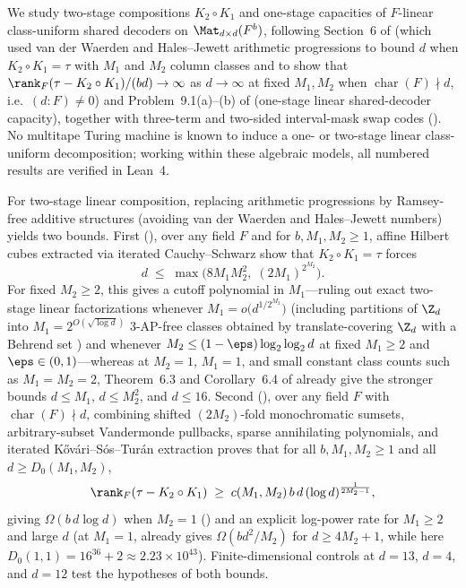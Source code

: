 We study two-stage compositions $K_2 \circ K_1$ and one-stage capacities of $F$-linear class-uniform
shared decoders on $\Mat_{d\times d}(F^b)$, following Section~6 of \cite{SharedDecoders2026} (which
used van der Waerden and Hales--Jewett arithmetic progressions to bound $d$ when $K_2 \circ K_1 = \tau$
with $M_1$ and $M_2$ column classes and to show that
$\rank_F(\tau - K_2 \circ K_1)/(bd) \to \infty$ as $d \to \infty$ at fixed $M_1, M_2$ when
$\operatorname{char}(F) \nmid d$, i.e.\ $(d : F) \ne 0$) and Problem~9.1(a)--(b) of
\cite{SeventeenthPaper2026} (one-stage linear shared-decoder capacity), together with three-term and
two-sided interval-mask swap codes (\cite[Remark~5.6 and Problem~9.3]{SeventeenthPaper2026}). No
multitape Turing machine is known to induce a one- or two-stage linear class-uniform decomposition;
working within these algebraic models, all numbered results are verified in Lean~4.

For two-stage linear composition, replacing arithmetic progressions by Ramsey-free additive structures
(avoiding van der Waerden and Hales--Jewett numbers) yields two bounds. First (), over any
field $F$ and for $b, M_1, M_2 \ge 1$, affine Hilbert cubes extracted via iterated Cauchy--Schwarz show
that $K_2 \circ K_1 = \tau$ forces
\[
  d \;\le\; \max\bigl(8 M_1 M_2^2,\; (2 M_1)^{2^{M_2}}\bigr).
\]
For fixed $M_2 \ge 2$, this gives a cutoff polynomial in $M_1$---ruling out exact two-stage linear
factorizations whenever $M_1 = o\bigl(d^{1/2^{M_2}}\bigr)$ (including partitions of $\Z_d$ into
$M_1 = 2^{O(\sqrt{\log d})}$ $3$-AP-free classes obtained by translate-covering $\Z_d$ with a Behrend
set \cite{Behrend1946}) and whenever $M_2 \le (1-\eps)\log_2\log_2 d$ at fixed $M_1 \ge 2$ and
$\eps \in (0, 1)$---whereas at $M_2 = 1$, $M_1 = 1$, and small constant class counts such as
$M_1 = M_2 = 2$, Theorem~6.3 and Corollary~6.4 of \cite{SharedDecoders2026} already give the stronger
bounds $d \le M_1$, $d \le M_2^2$, and $d \le 16$. Second (), over any field
$F$ with $\operatorname{char}(F) \nmid d$, combining shifted $(2M_2)$-fold monochromatic sumsets,
arbitrary-subset
Vandermonde pullbacks, sparse annihilating polynomials, and iterated K\H{o}v\'ari--S\'os--Tur\'an
extraction proves that for all $b, M_1, M_2 \ge 1$ and all $d \ge D_0(M_1, M_2)$,
\[
  \rank_F(\tau - K_2 \circ K_1)
  \;\ge\;
  c(M_1, M_2)\,b\,d\,(\log d)^{\frac{1}{2M_2 - 1}},
\]
giving $\Omega(b\,d\log d)$ when $M_2 = 1$ () and an explicit log-power rate for
$M_1 \ge 2$ and large $d$ (at $M_1 = 1$, \cite[Theorem~6.6]{SharedDecoders2026} already gives
$\Omega(bd^2/M_2)$ for $d \ge 4M_2 + 1$, while here $D_0(1,1) = 16^{36} + 2 \approx 2.23 \times 10^{43}$).
Finite-dimensional controls at $d = 13$, $d = 4$, and $d = 12$ test the hypotheses of both bounds.

